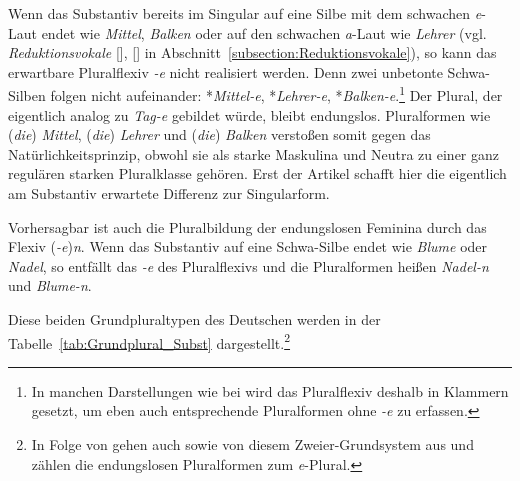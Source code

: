 Wenn das Substantiv bereits im Singular auf eine Silbe mit dem schwachen \textit{e}-Laut endet wie \textit{Mittel}, \textit{Balken} oder auf den schwachen \textit{a}-Laut wie \textit{Lehrer} (vgl. \textit{Reduktionsvokale} [\textipa{\textschwa}], [\textipa{\text\textturna}] in Abschnitt~\ref{subsection:Reduktionsvokale}), so kann das erwartbare Pluralflexiv \textit{-e} nicht realisiert werden. Denn zwei unbetonte Schwa-Silben folgen nicht aufeinander: *\textit{Mittel-e}, *\textit{Lehrer-e}, *\textit{Balken-e}.\footnote{In manchen Darstellungen wie bei \citet[39]{ThieroffVogel2012} wird das Pluralflexiv deshalb in Klammern gesetzt, um eben auch entsprechende Pluralformen ohne \textit{-e} zu erfassen.} Der Plural, der eigentlich analog zu \textit{Tag-e} gebildet würde, bleibt endungslos. Pluralformen wie (\textit{die}) \textit{Mittel}, (\textit{die}) \textit{Lehrer} und (\textit{die}) \textit{Balken} verstoßen somit gegen das Natürlichkeitsprinzip, obwohl sie als starke Maskulina und Neutra zu einer ganz regulären starken Pluralklasse gehören. Erst der Artikel schafft hier die eigentlich am Substantiv erwartete Differenz zur Singularform.

Vorhersagbar ist auch die Pluralbildung der endungslosen Feminina durch das Flexiv (\textit{-e})\textit{n}. Wenn das Substantiv auf eine Schwa-Silbe endet wie \textit{Blume} oder \textit{Nadel}, so entfällt das \textit{-e} des Pluralflexivs und die Pluralformen heißen \textit{Nadel-n} und \textit{Blume-n}.

Diese beiden Grundpluraltypen des Deutschen werden in der Tabelle~\ref{tab:Grundplural_Subst} dargestellt.\footnote{In Folge von \citet[224]{Augst1979} gehen auch \citet[172--173]{Eisenberg2020_Wort} sowie \citet[40--41]{ThieroffVogel2012} von diesem Zweier-Grundsystem aus und zählen die endungslosen Pluralformen zum \textit{e}-Plural.}

